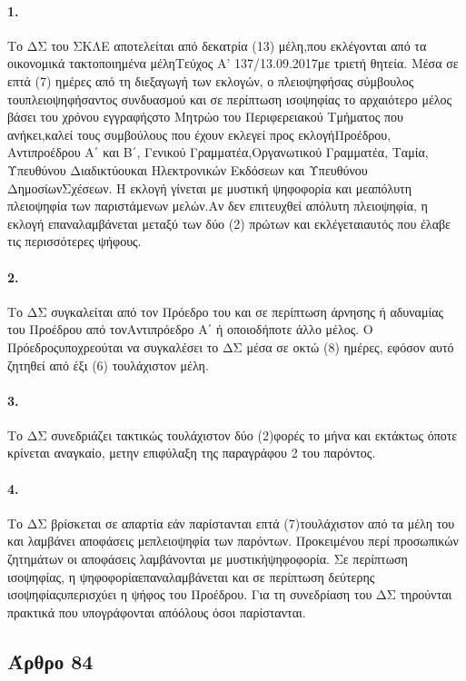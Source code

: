 \documentclass[a4paper,oneside, 10pt]{book}
\begin{document}
\paragraph { 1. } Το ΔΣ του ΣΚΛΕ αποτελείται από δεκατρία (13) μέλη,που εκλέγονται από τα οικονομικά τακτοποιημένα μέληΤεύχος Α’ 137/13.09.2017με τριετή θητεία. Μέσα σε επτά (7) ημέρες από τη διεξαγωγή των εκλογών, ο πλειοψηφήσας σύμβουλος τουπλειοψηφήσαντος συνδυασμού και σε περίπτωση ισοψηφίας το αρχαιότερο μέλος βάσει του χρόνου εγγραφήςστο Μητρώο του Περιφερειακού Τμήματος που ανήκει,καλεί τους συμβούλους που έχουν εκλεγεί προς εκλογήΠροέδρου, Αντιπροέδρου Α΄ και Β΄, Γενικού Γραμματέα,Οργανωτικού Γραμματέα, Ταμία, Υπευθύνου Διαδικτύουκαι Ηλεκτρονικών Εκδόσεων και Υπευθύνου ΔημοσίωνΣχέσεων. Η εκλογή γίνεται με μυστική ψηφοφορία και μεαπόλυτη πλειοψηφία των παριστάμενων μελών.Αν δεν επιτευχθεί απόλυτη πλειοψηφία, η εκλογή επαναλαμβάνεται μεταξύ των δύο (2) πρώτων και εκλέγεταιαυτός που έλαβε τις περισσότερες ψήφους.
\paragraph { 2. } Το ΔΣ συγκαλείται από τον Πρόεδρο του και σε περίπτωση άρνησης ή αδυναμίας του Προέδρου από τονΑντιπρόεδρο Α΄ ή οποιοδήποτε άλλο μέλος. Ο Πρόεδροςυποχρεούται να συγκαλέσει το ΔΣ μέσα σε οκτώ (8) ημέρες, εφόσον αυτό ζητηθεί από έξι (6) τουλάχιστον μέλη.
\paragraph { 3. } Το ΔΣ συνεδριάζει τακτικώς τουλάχιστον δύο (2)φορές το μήνα και εκτάκτως όποτε κρίνεται αναγκαίο, μετην επιφύλαξη της παραγράφου 2 του παρόντος.
\paragraph { 4. } Το ΔΣ βρίσκεται σε απαρτία εάν παρίστανται επτά (7)τουλάχιστον από τα μέλη του και λαμβάνει αποφάσεις μεπλειοψηφία των παρόντων. Προκειμένου περί προσωπικών ζητημάτων οι αποφάσεις λαμβάνονται με μυστικήψηφοφορία. Σε περίπτωση ισοψηφίας, η ψηφοφορίαεπαναλαμβάνεται και σε περίπτωση δεύτερης ισοψηφίαςυπερισχύει η ψήφος του Προέδρου. Για τη συνεδρίαση του ΔΣ τηρούνται πρακτικά που υπογράφονται απόόλους όσοι παρίστανται.
\subsection*{ Άρθρο 84 }
\end{document}
